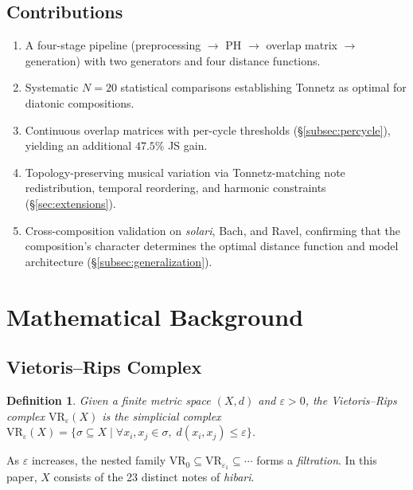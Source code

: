 \documentclass[conference,10pt,a4paper]{IEEEtran}
\newtheorem{definition}{Definition}
\begin{document}
\subsection{Contributions}
\begin{enumerate}
\item A four-stage pipeline (preprocessing $\to$ PH $\to$ overlap matrix
      $\to$ generation) with two generators and four distance functions.
\item Systematic $N=20$ statistical comparisons establishing Tonnetz as
      optimal for diatonic compositions.
\item Continuous overlap matrices with per-cycle thresholds
      (\S\ref{subsec:percycle}), yielding an additional $47.5\%$ JS gain.
\item Topology-preserving musical variation via Tonnetz-matching note
      redistribution, temporal reordering, and harmonic constraints
      (\S\ref{sec:extensions}).
\item Cross-composition validation on \emph{solari}, Bach, and Ravel,
      confirming that the composition's character determines the optimal
      distance function and model architecture (\S\ref{subsec:generalization}).
\end{enumerate}


\section{Mathematical Background}
\label{sec:background}

\subsection{Vietoris--Rips Complex}
\label{subsec:vr}

\begin{definition}
Given a finite metric space $(X, d)$ and $\varepsilon > 0$, the
\emph{Vietoris--Rips complex} $\mathrm{VR}_\varepsilon(X)$ is the
simplicial complex
$\mathrm{VR}_\varepsilon(X) = \{\sigma \subseteq X \mid
\forall x_i, x_j \in \sigma,\; d(x_i,x_j) \le \varepsilon\}$.
\end{definition}

As $\varepsilon$ increases, the nested family
$\mathrm{VR}_0 \subseteq \mathrm{VR}_{\varepsilon_1} \subseteq \cdots$
forms a \emph{filtration}.  In this paper, $X$ consists of the 23
distinct notes of \emph{hibari}.
\end{document}
